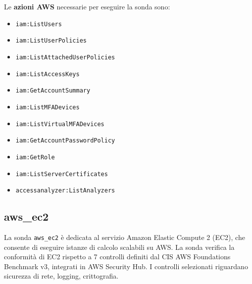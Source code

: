\noindent Le \textbf{azioni AWS} necessarie per eseguire la sonda sono:
\begin{itemize}
    \item \texttt{iam:ListUsers}
    \item \texttt{iam:ListUserPolicies}
    \item \texttt{iam:ListAttachedUserPolicies}
    \item \texttt{iam:ListAccessKeys}
    \item \texttt{iam:GetAccountSummary}
    \item \texttt{iam:ListMFADevices}
    \item \texttt{iam:ListVirtualMFADevices}
    \item \texttt{iam:GetAccountPasswordPolicy}
    \item \texttt{iam:GetRole}
    \item \texttt{iam:ListServerCertificates}
    \item \texttt{accessanalyzer:ListAnalyzers}
\end{itemize}

\subsection{aws\_ec2}
\label{sec:ec2}

La sonda \texttt{aws\_ec2} è dedicata al servizio Amazon Elastic Compute 2 (EC2), che consente di eseguire istanze di calcolo scalabili su AWS. La sonda verifica la conformità di EC2 rispetto a 7 controlli definiti dal CIS AWS Foundations Benchmark v3, integrati in AWS Security Hub. I controlli selezionati riguardano sicurezza di rete, logging, crittografia. 

